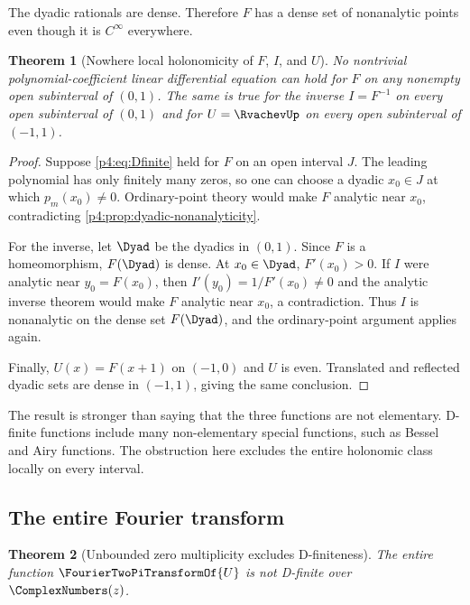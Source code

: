 \documentclass[11pt]{article}
\numberwithin{equation}{section}
\newtheorem{theorem}{Theorem}[section]
\theoremstyle{definition}
\theoremstyle{remark}
\begin{document}
The dyadic rationals are dense.  Therefore $F$ has a dense set of nonanalytic points even though it is $C^\infty$ everywhere.

\begin{theorem}[Nowhere local holonomicity of $F$, $I$, and $U$]
\label{p4:thm:physical-nondfinite}
No nontrivial polynomial-coefficient linear differential equation can hold for $F$ on any nonempty open subinterval of $(0,1)$.  The same is true for the inverse $I=F^{-1}$ on every open subinterval of $(0,1)$ and for $U=\RvachevUp$ on every open subinterval of $(-1,1)$.
\end{theorem}

\begin{proof}
Suppose \eqref{p4:eq:Dfinite} held for $F$ on an open interval $J$.  The leading polynomial has only finitely many zeros, so one can choose a dyadic $x_0\in J$ at which $p_m(x_0)\ne0$.  Ordinary-point theory would make $F$ analytic near $x_0$, contradicting \cref{p4:prop:dyadic-nonanalyticity}.

For the inverse, let $\Dyad$ be the dyadics in $(0,1)$.  Since $F$ is a homeomorphism, $F(\Dyad)$ is dense.  At $x_0\in\Dyad$, $F'(x_0)>0$.  If $I$ were analytic near $y_0=F(x_0)$, then $I'(y_0)=1/F'(x_0)\ne0$ and the analytic inverse theorem would make $F$ analytic near $x_0$, a contradiction.  Thus $I$ is nonanalytic on the dense set $F(\Dyad)$, and the ordinary-point argument applies again.

Finally, $U(x)=F(x+1)$ on $(-1,0)$ and $U$ is even.  Translated and reflected dyadic sets are dense in $(-1,1)$, giving the same conclusion.
\end{proof}

\begin{remark}
The result is stronger than saying that the three functions are not elementary.  D-finite functions include many non-elementary special functions, such as Bessel and Airy functions.  The obstruction here excludes the entire holonomic class locally on every interval.
\end{remark}

\subsection{The entire Fourier transform}
\begin{theorem}[Unbounded zero multiplicity excludes D-finiteness]
\label{p4:thm:fourier-nondfinite}
The entire function $\FourierTwoPiTransformOf{U}$ is not D-finite over $\ComplexNumbers(z)$.
\end{theorem}
\end{document}
